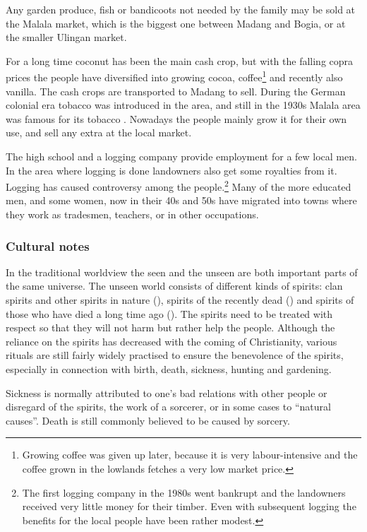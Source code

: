 Any garden produce, fish or bandicoots not needed by the family may be sold at the Malala market, which is the biggest one between Madang and Bogia, or at the smaller Ulingan market.  

For a long time coconut has been the main cash crop, but with the falling copra prices the people have diversified into growing cocoa, coffee\footnote{Growing coffee was given up later, because it is very labour-intensive and the  coffee grown in the lowlands fetches a very low market price.} and recently also vanilla.  The cash crops are transported to Madang to sell.  During the German colonial era tobacco was introduced in the area, and still in the 1930s Malala area was famous for its tobacco \citep[454]{Tranel1952}. Nowadays the people mainly grow it for their own use, and sell any extra at the local market.

The high school and a logging company provide employment for a few local men.  In the area where logging is done landowners also get some royalties from it.  Logging has caused controversy among the people.\footnote{The first logging company in the 1980s went bankrupt and the landowners received very little money for their timber.  Even with subsequent logging the benefits for the local people have been rather modest.} Many of the more educated men, and some women, now in their 40s and 50s have migrated into towns where they work as tradesmen, teachers, or in other occupations. 

\subsubsection{Cultural notes} 
In the traditional worldview the seen and the unseen are both important parts of the same universe.  The unseen world consists of different kinds of spirits: clan spirits and other spirits in nature (), spirits of the recently dead () and spirits of those who have died a long time ago (). The spirits need to be treated with respect so that they will not harm but rather help the people.  Although the reliance on the spirits has decreased with the coming of Christianity, various rituals are still fairly widely practised to ensure the benevolence of the spirits, especially in connection with birth, death, sickness, hunting and gardening. 

Sickness is normally attributed to one's bad relations with other people or disregard of the spirits, the work of a sorcerer, or in some cases to ``natural causes''. Death is still commonly believed to be caused by sorcery.

